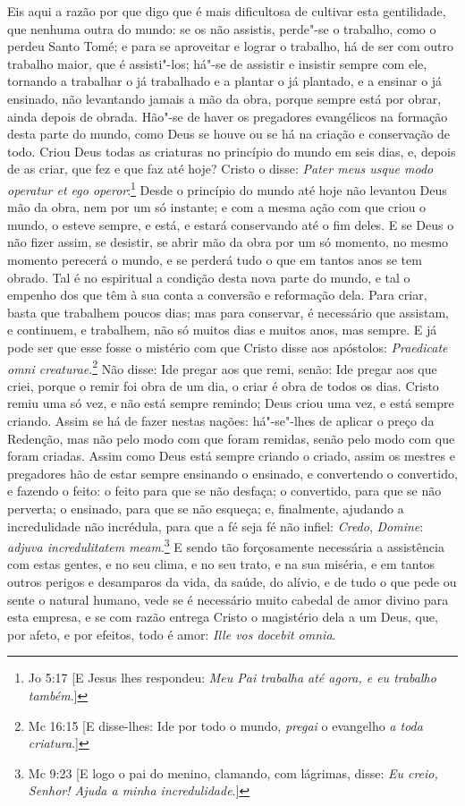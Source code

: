 Eis aqui a razão por que digo que é mais dificultosa de cultivar esta
gentilidade, que nenhuma outra do mundo: se os não assistis, perde"-se o
trabalho, como o perdeu Santo Tomé; e para se aproveitar e lograr o
trabalho, há de ser com outro trabalho maior, que é assisti"-los; há"-se
de assistir e insistir sempre com ele, tornando a trabalhar o já
trabalhado e a plantar o já plantado, e a ensinar o já ensinado, não
levantando jamais a mão da obra, porque sempre está por obrar, ainda
depois de obrada. Hão"-se de haver os pregadores evangélicos na formação
desta parte do mundo, como Deus se houve ou se há na criação e
conservação de todo. Criou Deus todas as criaturas no princípio do mundo
em seis dias, e, depois de as criar, que fez e que faz até hoje? Cristo
o disse: \emph{Pater meus usque modo operatur et ego operor}:\footnote{Jo 5:17 [E Jesus lhes respondeu: \emph{Meu Pai trabalha até agora, e eu trabalho também}.]} Desde o
princípio do mundo até hoje não levantou Deus mão da obra, nem por um só
instante; e com a mesma ação com que criou o mundo, o esteve sempre, e
está, e estará conservando até o fim deles. E se Deus o não fizer assim,
se desistir, se abrir mão da obra por um
só momento, no mesmo momento perecerá o mundo, e se perderá tudo o que
em tantos anos se tem obrado. Tal é no espiritual a condição desta nova
parte do mundo, e tal o empenho dos que têm à sua conta a conversão e
reformação dela. Para criar, basta que trabalhem poucos dias; mas para
conservar, é necessário que assistam, e continuem, e trabalhem, não só
muitos dias e muitos anos, mas sempre. E já pode ser que esse fosse o
mistério com que Cristo disse aos apóstolos: \emph{Praedicate omni
creaturae}.\footnote{Mc 16:15 [E disse-lhes: Ide por todo o mundo, \emph{pregai} o evangelho \emph{a toda criatura}.]} Não disse: Ide pregar aos que remi, senão: Ide
pregar aos que criei, porque o remir foi obra de um dia, o criar é obra
de todos os dias. Cristo remiu uma só vez, e não está sempre remindo;
Deus criou uma vez, e está sempre criando. Assim se há de fazer nestas
nações: há"-se"-lhes de aplicar o preço da Redenção, mas não pelo modo com
que foram remidas, senão pelo modo com que foram criadas. Assim como
Deus está sempre criando o criado, assim os mestres e pregadores hão de
estar sempre ensinando o ensinado, e convertendo o convertido, e fazendo
o feito: o feito para que se não desfaça; o convertido, para que se não
perverta; o ensinado, para que se não esqueça; e, finalmente, ajudando a
incredulidade não incrédula, para que a fé seja fé não infiel:
\emph{Credo}, \emph{Domine}: \emph{adjuva incredulitatem meam}.\footnote{Mc 9:23 [E logo o pai do menino, clamando, com lágrimas, disse: \emph{Eu creio, Senhor! Ajuda a minha
incredulidade}.]} E sendo
tão forçosamente necessária a assistência com estas gentes, e no seu
clima, e no seu trato, e na sua miséria, e em tantos outros perigos e
desamparos da vida, da saúde, do alívio, e de tudo o que pede ou sente o
natural humano, vede se é necessário muito cabedal de amor divino para
esta empresa, e se com razão entrega Cristo o magistério dela a um Deus,
que, por afeto, e por efeitos, todo é amor: \emph{Ille vos docebit
omnia}.

